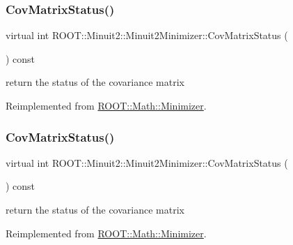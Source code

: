 \subsubsection{\texorpdfstring{CovMatrixStatus()}{CovMatrixStatus()}\hspace{0.1cm}{\footnotesize\ttfamily [1/2]}}
{\footnotesize\ttfamily virtual int R\+O\+O\+T\+::\+Minuit2\+::\+Minuit2\+Minimizer\+::\+Cov\+Matrix\+Status (\begin{DoxyParamCaption}{ }\end{DoxyParamCaption}) const\hspace{0.3cm}{\ttfamily [virtual]}}

return the status of the covariance matrix 

Reimplemented from \mbox{\hyperlink{classROOT_1_1Math_1_1Minimizer_a5f5eab490760ff361d9c44369e9d754d}{R\+O\+O\+T\+::\+Math\+::\+Minimizer}}.

\mbox{\label{classROOT_1_1Minuit2_1_1Minuit2Minimizer_ad9f4873b9651626d2b83cf7eab826b0f}} 
\subsubsection{\texorpdfstring{CovMatrixStatus()}{CovMatrixStatus()}\hspace{0.1cm}{\footnotesize\ttfamily [2/2]}}
{\footnotesize\ttfamily virtual int R\+O\+O\+T\+::\+Minuit2\+::\+Minuit2\+Minimizer\+::\+Cov\+Matrix\+Status (\begin{DoxyParamCaption}{ }\end{DoxyParamCaption}) const\hspace{0.3cm}{\ttfamily [virtual]}}

return the status of the covariance matrix 

Reimplemented from \mbox{\hyperlink{classROOT_1_1Math_1_1Minimizer_a5f5eab490760ff361d9c44369e9d754d}{R\+O\+O\+T\+::\+Math\+::\+Minimizer}}.

\mbox{\label{classROOT_1_1Minuit2_1_1Minuit2Minimizer_ab9c1bfaaaf4c12acd1fd96ece3509269}} 
